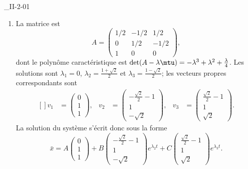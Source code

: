 \begin{corrige}{_II-2-01}
\begin{enumerate}
\item
La matrice est
\begin{equation}
	A=\begin{pmatrix}
  1/2	&	-1/2	&	1/2\\ 
  0	&	1/2	&	-1/2\\ 
 1	&	0	& 0	  
\end{pmatrix},
\end{equation}
dont le polynôme caractéristique est $\det(A-\lambda\mtu)=-\lambda^3+\lambda^2+\frac{ \lambda }{ 4 }$. Les solutions sont $\lambda_1=0$, $\lambda_2=\frac{ 1+\sqrt{2} }{2}$ et $\lambda_3=\frac{ 1-\sqrt{2} }{2}$; les vecteurs propres correspondants sont
\begin{equation}
	\begin{aligned}[]
		v_1&=\begin{pmatrix}
	0	\\ 
	1	\\ 
	1	
\end{pmatrix},&v_2&=\begin{pmatrix}
	-\frac{ \sqrt{2} }{ 2 }-1	\\ 
	1	\\ 
	-\sqrt{2}	
\end{pmatrix},&v_3&=\begin{pmatrix}
	\frac{ \sqrt{2} }{2}-1	\\ 
	1	\\ 
	\sqrt{2}	
\end{pmatrix}.
	\end{aligned}
\end{equation}
La solution du système s'écrit donc sous la forme
\begin{equation}
	\bar x=A
		\begin{pmatrix}
	0	\\ 
	1	\\ 
	1	
\end{pmatrix}+B\begin{pmatrix}
	-\frac{ \sqrt{2} }{ 2 }-1	\\ 
	1	\\ 
	-\sqrt{2}	
\end{pmatrix} e^{\lambda_2t}+C\begin{pmatrix}
	\frac{ \sqrt{2} }{2}-1	\\ 
	1	\\ 
	\sqrt{2}	
\end{pmatrix} e^{\lambda_3t}.
\end{equation}


\end{enumerate}
\end{corrige}
